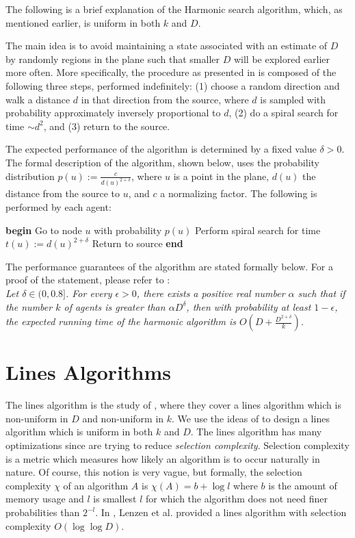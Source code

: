 \documentclass[runningheads,a4paper]{llncs}
\begin{document}
The following is a brief explanation of the Harmonic search algorithm, which, as mentioned earlier, is uniform in both $k$ and $D$.

The main idea is to avoid maintaining a state associated with an estimate of $D$ by randomly regions in the plane such that smaller $D$ will be explored earlier more often. More specifically, the procedure as presented in \cite{feinerman2012collaborative} is composed of the following three steps, performed indefinitely: (1) choose a random direction and walk a distance $d$ in that direction from the source, where $d$ is sampled with probability approximately inversely proportional to $d$, (2) do a spiral search for time $\sim d^2$, and (3) return to the source.

The expected performance of the algorithm is determined by a fixed value $\delta > 0$. The formal description of the algorithm, shown below, uses the probability distribution $p(u) := \frac{c}{d(u)^{2+\delta}}$, where $u$ is a point in the plane, $d(u)$ the distance from the source to $u$, and $c$ a normalizing factor. The following is performed by each agent:

\begin{codebox}
\li \textbf{begin}
\Then 
\li Go to node $u$ with probability $p(u)$
\li Perform spiral search for time $t(u) := d(u)^{2+\delta}$
\li Return to source 
\End
\li \textbf{end} 
\end{codebox}

The performance guarantees of the algorithm are stated formally below. For a proof of the statement, please refer to \cite{feinerman2012collaborative}: \\

\emph{
Let $\delta \in (0,0.8]$. For every $\epsilon > 0$, there exists a positive real number $\alpha$ such that if the number $k$ of agents is greater than $\alpha D^{\delta}$, then with probability at least $1-\epsilon$, the expected running time of the harmonic algorithm is $O( D + \frac{D^{2+\delta}}{k})$.
}

\section{Lines Algorithms}
\label{lines}

The lines algorithm is the study of \cite{lenzen2014trade}, where they cover a lines algorithm which is non-uniform in $D$ and non-uniform in $k$. We use the ideas of \cite{feinerman2012collaborative} to design a lines algorithm which is uniform in both $k$ and $D$. The lines algorithm has many optimizations since \cite{lenzen2014trade} are trying to reduce \emph{selection complexity}. Selection complexity is a metric which measures how likely an algorithm is to occur naturally in nature. Of course, this notion is very vague, but formally, the selection complexity $\chi$ of an algorithm $A$ is $\chi(A) = b + \log l$ where $b$ is the amount of memory usage and $l$ is smallest $l$ for which the algorithm does not need finer probabilities than $2^{-l}$. In \cite{lenzen2014trade}, Lenzen et al. provided a lines algorithm with selection complexity $O(\log \log D)$.
\end{document}
